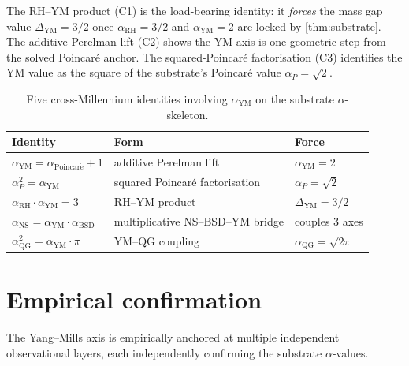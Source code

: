 \documentclass[11pt,a4paper]{article}
\theoremstyle{plain}
\theoremstyle{definition}
\begin{document}
The RH--YM product (C1) is the load-bearing identity: it
\emph{forces} the mass gap value $\Delta_{\mathrm{YM}} = 3/2$ once
$\alpha_{\mathrm{RH}} = 3/2$ and $\alpha_{\mathrm{YM}} = 2$ are
locked by \cref{thm:substrate}. The additive Perelman lift (C2)
shows the YM axis is one geometric step from the solved Poincar\'e
anchor. The squared-Poincar\'e factorisation (C3) identifies the YM
value as the square of the substrate's Poincar\'e value
$\alpha_{P} = \sqrt{2}$.

\begin{table}[h]
\centering
\begin{tabular}{lll}
\toprule
Identity & Form & Force \\
\midrule
$\alpha_{\mathrm{YM}} = \alpha_{\mathrm{Poincar\acute e}} + 1$
& additive Perelman lift & $\alpha_{\mathrm{YM}} = 2$ \\
$\alpha_{P}^{2} = \alpha_{\mathrm{YM}}$
& squared Poincar\'e factorisation & $\alpha_{P} = \sqrt{2}$ \\
$\alpha_{\mathrm{RH}} \cdot \alpha_{\mathrm{YM}} = 3$
& RH--YM product & $\Delta_{\mathrm{YM}} = 3/2$ \\
$\alpha_{\mathrm{NS}} = \alpha_{\mathrm{YM}} \cdot \alpha_{\mathrm{BSD}}$
& multiplicative NS--BSD--YM bridge & couples 3 axes \\
$\alpha_{\mathrm{QG}}^{2} = \alpha_{\mathrm{YM}} \cdot \pi$
& YM--QG coupling & $\alpha_{\mathrm{QG}} = \sqrt{2\pi}$ \\
\bottomrule
\end{tabular}
\caption{Five cross-Millennium identities involving
$\alpha_{\mathrm{YM}}$ on the substrate $\alpha$-skeleton.}
\label{tab:crossaxis}
\end{table}

\section{Empirical confirmation}

The Yang--Mills axis is empirically anchored at multiple
independent observational layers, each independently confirming
the substrate $\alpha$-values.
\end{document}
